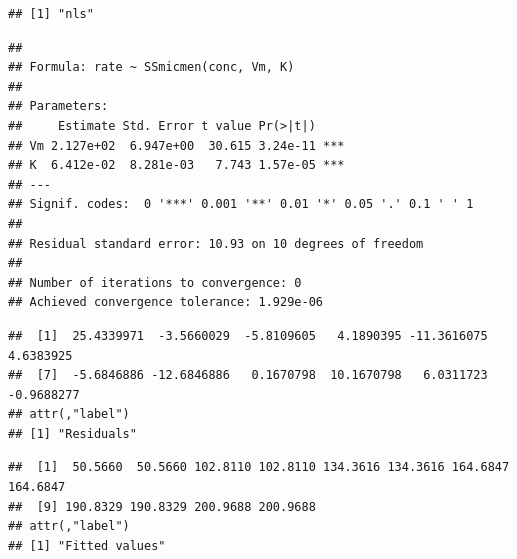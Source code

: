 \documentclass[krantz2]{krantz}\usepackage{knitr}
\begin{document}
\begin{knitrout}\footnotesize
{}\color{fgcolor}\begin{kframe}
\begin{alltt}
\end{alltt}
\begin{verbatim}
## [1] "nls"
\end{verbatim}
\begin{alltt}
\end{alltt}
\begin{verbatim}
## 
## Formula: rate ~ SSmicmen(conc, Vm, K)
## 
## Parameters:
##     Estimate Std. Error t value Pr(>|t|)    
## Vm 2.127e+02  6.947e+00  30.615 3.24e-11 ***
## K  6.412e-02  8.281e-03   7.743 1.57e-05 ***
## ---
## Signif. codes:  0 '***' 0.001 '**' 0.01 '*' 0.05 '.' 0.1 ' ' 1
## 
## Residual standard error: 10.93 on 10 degrees of freedom
## 
## Number of iterations to convergence: 0 
## Achieved convergence tolerance: 1.929e-06
\end{verbatim}
\begin{alltt}
\end{alltt}
\begin{verbatim}
##  [1]  25.4339971  -3.5660029  -5.8109605   4.1890395 -11.3616075   4.6383925
##  [7]  -5.6846886 -12.6846886   0.1670798  10.1670798   6.0311723  -0.9688277
## attr(,"label")
## [1] "Residuals"
\end{verbatim}
\begin{alltt}
\end{alltt}
\begin{verbatim}
##  [1]  50.5660  50.5660 102.8110 102.8110 134.3616 134.3616 164.6847 164.6847
##  [9] 190.8329 190.8329 200.9688 200.9688
## attr(,"label")
## [1] "Fitted values"
\end{verbatim}
\end{kframe}
\end{knitrout}
\end{document}
